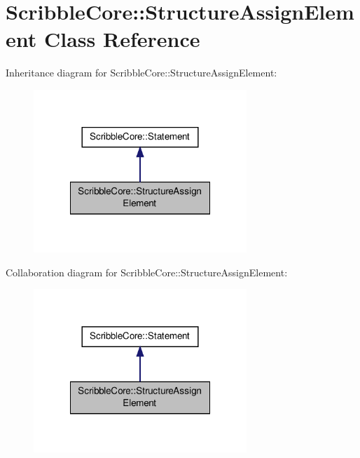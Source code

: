\hypertarget{class_scribble_core_1_1_structure_assign_element}{\section{Scribble\-Core\-:\-:Structure\-Assign\-Element Class Reference}
\label{class_scribble_core_1_1_structure_assign_element}
}


Inheritance diagram for Scribble\-Core\-:\-:Structure\-Assign\-Element\-:\nopagebreak
\begin{figure}[H]
\begin{center}
\leavevmode
\includegraphics[width=228pt]{class_scribble_core_1_1_structure_assign_element__inherit__graph}
\end{center}
\end{figure}


Collaboration diagram for Scribble\-Core\-:\-:Structure\-Assign\-Element\-:\nopagebreak
\begin{figure}[H]
\begin{center}
\leavevmode
\includegraphics[width=228pt]{class_scribble_core_1_1_structure_assign_element__coll__graph}
\end{center}
\end{figure}
